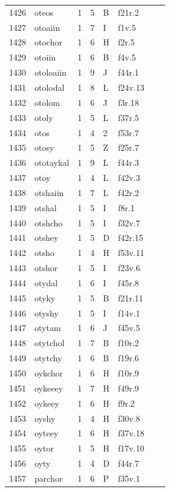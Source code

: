 \documentclass[11pt,a4paper]{article}
\begin{document}
\begin{landscape}
\begin{longtable}{@{}r>{\ttfamily}lrrl>{\ttfamily}l>{\raggedright\arraybackslash}p{80mm}>{\raggedright\arraybackslash}p{36mm}@{}}
1426 & oteos & 1 & 5 & B & f21r.2 &  & \\
1427 & otoaiin & 1 & 7 & I & f1v.5 &  & \\
1428 & otochor & 1 & 6 & H & f2r.5 &  & \\
1429 & otoiin & 1 & 6 & B & f4v.5 &  & \\
1430 & otoloaiin & 1 & 9 & J & f44r.1 &  & \\
1431 & otolodal & 1 & 8 & L & f24v.13 &  & \\
1432 & otolom & 1 & 6 & J & f3r.18 &  & \\
1433 & otoly & 1 & 5 & L & f37r.5 &  & \\
1434 & otos & 1 & 4 & 2 & f53r.7 &  & \\
1435 & otosy & 1 & 5 & Z & f25r.7 &  & \\
1436 & ototaykal & 1 & 9 & L & f44r.3 &  & \\
1437 & otoy & 1 & 4 & L & f42v.3 &  & \\
1438 & otshaiin & 1 & 7 & L & f42r.2 &  & \\
1439 & otshal & 1 & 5 & I & f8r.1 &  & \\
1440 & otshcho & 1 & 5 & I & f32v.7 &  & \\
1441 & otshey & 1 & 5 & D & f42r.15 &  & \\
1442 & otsho & 1 & 4 & H & f53v.11 &  & \\
1443 & otshor & 1 & 5 & I & f23v.6 &  & \\
1444 & otydal & 1 & 6 & I & f45r.8 &  & \\
1445 & otyky & 1 & 5 & B & f21r.11 &  & \\
1446 & otyshy & 1 & 5 & I & f14v.1 &  & \\
1447 & otytam & 1 & 6 & J & f45v.5 &  & \\
1448 & otytchol & 1 & 7 & B & f10r.2 &  & \\
1449 & otytchy & 1 & 6 & B & f19r.6 &  & \\
1450 & oykchor & 1 & 6 & H & f10r.9 &  & \\
1451 & oykeeey & 1 & 7 & H & f49r.9 &  & \\
1452 & oykeey & 1 & 6 & H & f9r.2 &  & \\
1453 & oyshy & 1 & 4 & H & f30v.8 &  & \\
1454 & oyteey & 1 & 6 & H & f37v.18 &  & \\
1455 & oytor & 1 & 5 & H & f17v.10 &  & \\
1456 & oyty & 1 & 4 & D & f44r.7 &  & \\
1457 & parchor & 1 & 6 & P & f35v.1 &  & \\

\end{longtable}
\end{landscape}
\end{document}
